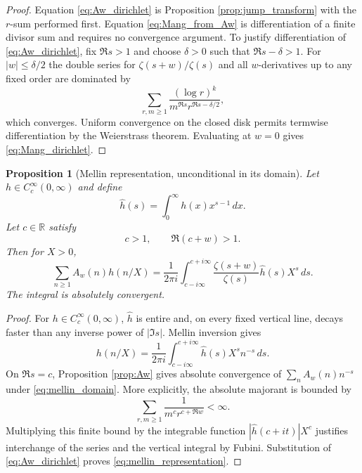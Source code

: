 \documentclass[11pt]{amsart}
\numberwithin{equation}{section}
\theoremstyle{plain}
\newtheorem{proposition}[theorem]{Proposition}
\theoremstyle{definition}
\theoremstyle{remark}
\newcommand{\R}{\mathbb R}
\begin{document}
\begin{proof}
Equation \eqref{eq:Aw_dirichlet} is Proposition \ref{prop:jump_transform} with the $r$-sum performed first.  Equation \eqref{eq:Mang_from_Aw} is differentiation of a finite divisor sum and requires no convergence argument.  To justify differentiation of \eqref{eq:Aw_dirichlet}, fix $\Re s>1$ and choose $\delta>0$ such that $\Re s-\delta>1$.  For $|w|\le\delta/2$ the double series for $\zeta(s+w)/\zeta(s)$ and all $w$-derivatives up to any fixed order are dominated by
\begin{equation}
\sum_{r,m\ge1}\frac{(\log r)^k}{m^{\Re s}r^{\Re s-\delta/2}},
\label{eq:Aw_derivative_domination}
\end{equation}
which converges.  Uniform convergence on the closed disk permits termwise differentiation by the Weierstrass theorem.  Evaluating at $w=0$ gives \eqref{eq:Mang_dirichlet}.
\end{proof}

\begin{proposition}[Mellin representation, unconditional in its domain]
\label{prop:mellin}
Let $h\in C_c^\infty(0,\infty)$ and define
\begin{equation}
\widehat h(s)=\int_0^\infty h(x)x^{s-1}\,dx.
\label{eq:mellin_transform}
\end{equation}
Let $c\in\R$ satisfy
\begin{equation}
c>1,
\qquad
\Re(c+w)>1.
\label{eq:mellin_domain}
\end{equation}
Then for $X>0$,
\begin{equation}
\sum_{n\ge1}A_w(n)h(n/X)
=\frac1{2\pi i}\int_{c-i\infty}^{c+i\infty}
\frac{\zeta(s+w)}{\zeta(s)}\widehat h(s)X^s\,ds.
\label{eq:mellin_representation}
\end{equation}
The integral is absolutely convergent.
\end{proposition}

\begin{proof}
For $h\in C_c^\infty(0,\infty)$, $\widehat h$ is entire and, on every fixed vertical line, decays faster than any inverse power of $|\Im s|$.  Mellin inversion gives
\begin{equation}
h(n/X)=\frac1{2\pi i}\int_{c-i\infty}^{c+i\infty}\widehat h(s)X^s n^{-s}\,ds.
\label{eq:mellin_inversion}
\end{equation}
On $\Re s=c$, Proposition \ref{prop:Aw} gives absolute convergence of $\sum_n A_w(n)n^{-s}$ under \eqref{eq:mellin_domain}.  More explicitly, the absolute majorant is bounded by
\begin{equation}
\sum_{r,m\ge1}\frac1{m^c r^{c+\Re w}}<\infty.
\label{eq:mellin_series_majorant}
\end{equation}
Multiplying this finite bound by the integrable function $|\widehat h(c+it)|X^c$ justifies interchange of the series and the vertical integral by Fubini.  Substitution of \eqref{eq:Aw_dirichlet} proves \eqref{eq:mellin_representation}.
\end{proof}
\end{document}
